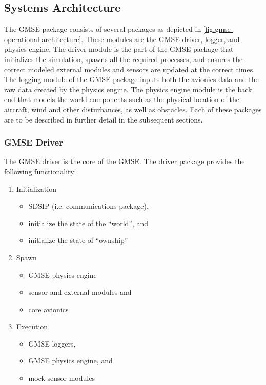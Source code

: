 \subsection{Systems Architecture} \label{sec:gmse-systems-architecture}

The GMSE package consists of several packages as depicted in \autoref{fig:gmse-operational-architecture}. These modules
are the GMSE driver, logger, and physics engine. The driver module is the part of the GMSE package that initializes the
simulation, spawns all the required processes, and ensures the correct modeled external modules and sensors are updated
at the correct times. The logging module of the GMSE package inputs both the avionics data and the raw data created by
the physics engine. The physics engine module is the back end that models the world components such as the physical
location of the aircraft, wind and other disturbances, as well as obstacles. Each of these packages are to be described
in further detail in the subsequent sections.

\subsubsection{GMSE Driver}

The GMSE driver is the core of the GMSE. The driver package provides the following functionality:

\begin{enumerate}
  \item Initialization
    \begin{itemize}
      \item SDSIP (i.e. communications package),
      \item initialize the state of the ``world'', and
      \item initialize the state of ``ownship''
    \end{itemize}
  \item Spawn
    \begin{itemize}
      \item GMSE physics engine
      \item sensor and external modules and
      \item core avionics
    \end{itemize}
  \item Execution
    \begin{itemize}
      \item GMSE loggers,
      \item GMSE physics engine, and
      \item mock sensor modules
    \end{itemize}
\end{enumerate}


